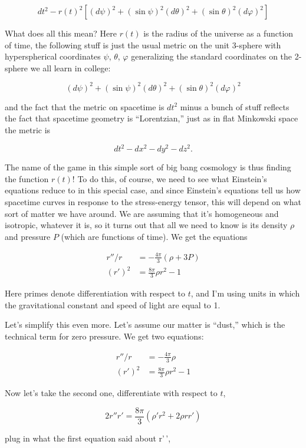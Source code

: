 \documentclass{article}
\begin{document}
\[dt^2 - r(t)^2[(d\psi)^2 + (\sin \psi)^2{(d\theta)^2 + (\sin \theta)^2 (d\varphi)^2}]\]

What does all this mean? Here \(r(t)\) is the radius of the universe as
a function of time, the following stuff is just the usual metric on the
unit 3-sphere with hyperspherical coordinates \(\psi\), \(\theta\),
\(\varphi\) generalizing the standard coordinates on the 2-sphere we all
learn in college:

\[(d\psi)^2 + (\sin \psi)^2{(d\theta)^2 + (\sin \theta)^2 (d\varphi)^2}\]

and the fact that the metric on spacetime is \(dt^2\) minus a bunch of
stuff reflects the fact that spacetime geometry is ``Lorentzian,'' just
as in flat Minkowski space the metric is

\[dt^2 - dx^2 - dy^2 - dz^2.\]

The name of the game in this simple sort of big bang cosmology is thus
finding the function \(r(t)\)! To do this, of course, we need to see
what Einstein's equations reduce to in this special case, and since
Einstein's equations tell us how spacetime curves in response to the
stress-energy tensor, this will depend on what sort of matter we have
around. We are assuming that it's homogeneous and isotropic, whatever it
is, so it turns out that all we need to know is its density \(\rho\) and
pressure \(P\) (which are functions of time). We get the equations

\[\begin{aligned}r''/r &= -\frac{4\pi}{3}(\rho+3P) \\ (r')^2 &= \frac{8\pi}{3}\rho r^2 - 1\end{aligned}\]

Here primes denote differentiation with respect to \(t\), and I'm using
units in which the gravitational constant and speed of light are equal
to 1.

Let's simplify this even more. Let's assume our matter is ``dust,''
which is the technical term for zero pressure. We get two equations:

\[\begin{aligned}r''/r &= -\frac{4\pi}{3}\rho \\ (r')^2 &= \frac{8\pi}{3}\rho r^2 - 1\end{aligned}\tag{1}\]

Now let's take the second one, differentiate with respect to \(t\),

\[2r''r' = \frac{8\pi}{3}(\rho'r^2 + 2 \rho r r')\]

plug in what the first equation said about r'\,',
\end{document}
